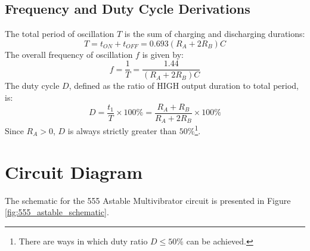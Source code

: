 \subsection{Frequency and Duty Cycle Derivations}
The total period of oscillation $T$ is the sum of charging and discharging durations:
\begin{equation}
T = t_{ON} + t_{OFF} = 0.693 (R_A + 2 R_B) C
\end{equation}
The overall frequency of oscillation $f$ is given by:
\begin{equation}
f = \frac{1}{T} = \frac{1.44}{(R_A + 2 R_B) C}
\end{equation}
The duty cycle $D$, defined as the ratio of HIGH output duration to total period, is:
\begin{equation}
D = \frac{t_1}{T} \times 100\% = \frac{R_A + R_B}{R_A + 2 R_B} \times 100\%
\end{equation}
Since $R_A > 0$, $D$ is always strictly greater than $50\%$\footnote{There are ways in which duty ratio $D\le 50\%$ can be achieved.}.

\section{Circuit Diagram}
The schematic for the 555 Astable Multivibrator circuit is presented in Figure \ref{fig:555_astable_schematic}.

